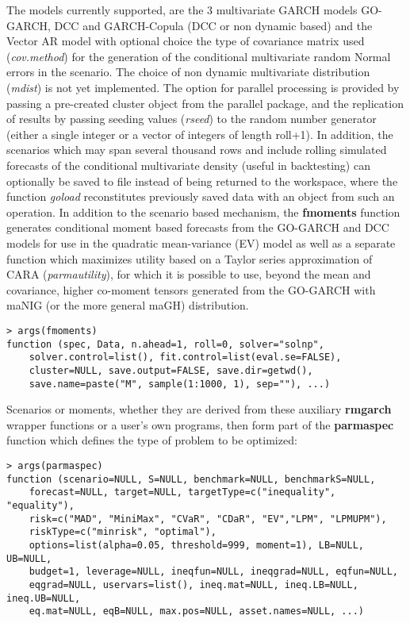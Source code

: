The models currently supported, are the 3 multivariate GARCH models GO-GARCH,
DCC and GARCH-Copula (DCC or non dynamic based) and the Vector AR model with
optional choice the type of covariance matrix used (\emph{cov.method}) for
the generation of the conditional multivariate random Normal errors in the
scenario. The choice of non dynamic multivariate distribution (\emph{mdist})
is not yet implemented. The option for parallel processing is provided by
passing a pre-created cluster object from the parallel package, and the replication
of results by passing seeding values (\emph{rseed}) to the random number
generator (either a single integer or a vector of integers of length roll+1).
In addition, the scenarios which may span several thousand rows and include rolling
simulated forecasts of the  conditional multivariate density (useful in backtesting)
can optionally be saved to file instead of being returned to the workspace,
where the function \emph{goload} reconstitutes previously saved data with
an object from such an operation. In addition to the scenario based mechanism,
the \textbf{fmoments} function generates conditional moment based forecasts
from the GO-GARCH and DCC models for use in the quadratic mean-variance (EV)
model as well as a separate function which maximizes utility based on a
Taylor series approximation of CARA (\emph{parmautility}), for which it
is possible to use, beyond the mean and covariance, higher co-moment tensors
generated from the GO-GARCH with maNIG (or the more general maGH) distribution.
\newline
\begin{lstlisting}
> args(fmoments)
function (spec, Data, n.ahead=1, roll=0, solver="solnp",
    solver.control=list(), fit.control=list(eval.se=FALSE),
    cluster=NULL, save.output=FALSE, save.dir=getwd(),
    save.name=paste("M", sample(1:1000, 1), sep=""), ...)
\end{lstlisting}
Scenarios or moments, whether they are derived from these auxiliary \textbf{rmgarch}
wrapper functions or a user's own programs, then form part of the \textbf{parmaspec}
function which defines the type of problem to be optimized:\\
\begin{lstlisting}
> args(parmaspec)
function (scenario=NULL, S=NULL, benchmark=NULL, benchmarkS=NULL,
    forecast=NULL, target=NULL, targetType=c("inequality", "equality"),
    risk=c("MAD", "MiniMax", "CVaR", "CDaR", "EV","LPM", "LPMUPM"),
    riskType=c("minrisk", "optimal"),
    options=list(alpha=0.05, threshold=999, moment=1), LB=NULL, UB=NULL,
    budget=1, leverage=NULL, ineqfun=NULL, ineqgrad=NULL, eqfun=NULL,
    eqgrad=NULL, uservars=list(), ineq.mat=NULL, ineq.LB=NULL, ineq.UB=NULL,
    eq.mat=NULL, eqB=NULL, max.pos=NULL, asset.names=NULL, ...)
\end{lstlisting}
